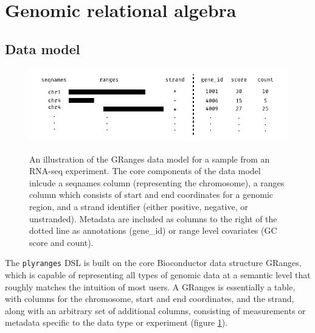 \documentclass[10pt,letterpaper]{article}
\begin{document}
\hypertarget{genomic-relational-algebra}{%
\section{Genomic relational algebra}\label{genomic-relational-algebra}}

\hypertarget{data-model}{%
\subsection{Data model}\label{data-model}}

\begin{figure}
{\centering \includegraphics[width=400pt]{diagrams/diagrams-001}}
\caption{An illustration of the GRanges data model for a
sample from an RNA-seq experiment. The core components of the data model
inlcude a seqnames column (representing the chromosome), a ranges column
which consists of start and end coordinates for a genomic region, and a
strand identifier (either positive, negative, or unstranded). Metadata
are included as columns to the right of the dotted line as annotations
(gene\_id) or range level covariates (GC score and count).}
\label{fig:GRanges} 
\end{figure}

The \texttt{plyranges} DSL is built on the core Bioconductor data
structure GRanges, which is capable of representing all types of genomic
data at a semantic level that roughly matches the intuition of most
users. A GRanges is essentially a table, with columns for the
chromosome, start and end coordinates, and the strand, along with an
arbitrary set of additional columns, consisting of measurements or
metadata specific to the data type or experiment (figure
\ref{fig:GRanges}).
\end{document}
